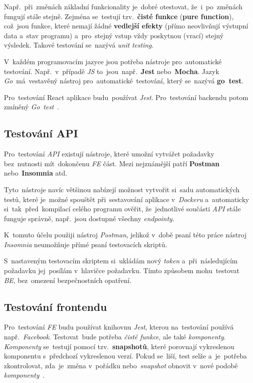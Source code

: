 \documentclass[11pt,a4paper]{report}
\let\oldacrshort\acrshort
\renewcommand{\acrshort}[1]{\emph{\normalsize\color[rgb]{0,0,0}\noindent\oldacrshort{#1}}}
\begin{document}
            Např.~při~změnách základní funkcionality je~dobré otestovat, že~i~po~změnách fungují stále stejně. Zejména se~testují tzv.~\textbf{čisté funkce} (\textbf{pure function}), což~jsou funkce, které nemají žádné \textbf{vedlejší efekty} (přímo neovlivňují výstupní data a~stav programu) a~pro~stejný vstup vždy poskytnou (vrací) stejný výsledek. Takové testování se~nazývá \emph{unit testing}.
            
            V~každém programovacím jazyce jsou potřeba nástroje pro~automatické testování. Např.~v~případě \acrshort{JS} to~jsou~např.~\textbf{Jest} nebo~\textbf{Mocha}. Jazyk \emph{Go}~má~vestavěný nástroj pro~automatické~testování, který se~nazývá \textbf{go~test}.
            
            Pro~testování React aplikace budu~používat \emph{Jest}. Pro~testování backendu potom zmíněný \emph{Go~test}~\cite{jestjsTestingReact}.
            
            \subsection{Testování API}
                Pro~testování \acrshort{API} existují nástroje, které umožní vytvářet požadavky bez~nutnosti mít~dokončenu \acrshort{FE} část. Mezi nejznámější patří \textbf{Postman} nebo~\textbf{Insomnia} atd.
                
                Tyto~nástroje navíc většinou nabízejí možnost vytvořit si~sadu automatických testů, které je~možné spouštět při~sestavování aplikace v~\emph{Dockeru} a~automaticky si~tak~před~kompilací celého programu ověřit, že~jednotlivé součásti \acrshort{API} stále funguje správně, např.~jsou dostupné všechny \emph{endpointy}.

                K~tomuto účelu použiji nástroj \emph{Postman}, jelikož v~době psaní této práce nástroj \emph{Insomnia} neumožňuje přímé psaní testovacích skriptů. 
                
                S~nastaveným testovacím skriptem si~ukládám nový \emph{token} a~při~následujícím požadavku jej~posílám v~hlavičce požadavku. Tímto způsobem mohu~testovat \acrshort{BE}, bez~omezení bezpečnostních opatření.

            \subsection{Testování frontendu}
                Pro~testování \acrshort{FE} budu používat knihovnu \emph{Jest}, kterou na~testování používá např.~\emph{Facebook}. Testovat~bude potřeba \emph{čisté funkce}, ale také \emph{komponenty}. \emph{Komponenty} se~testují pomocí tzv.~\textbf{snapshotů}, které porovnají vykreslenou komponentu s~předchozí vykreslenou verzí. Pokud se~liší, test selže a~je~potřeba zkontrolovat, zda~je~změna v~pořádku nebo~\emph{snapshot} obnovit v~nové podobě \emph{komponenty}~\cite{jestjsTestingReact}.
\end{document}
